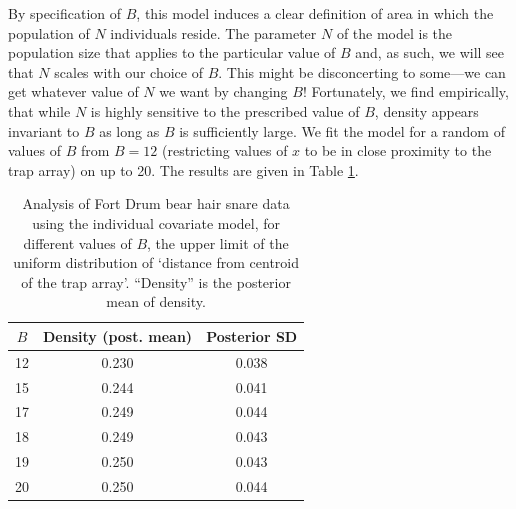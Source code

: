 By specification of $B$,
this model
induces a clear definition of area
in which the population of $N$ individuals reside.
The parameter $N$ of the model is the
population size that applies to the particular value of $B$ and,
as such, we will see that $N$ scales with our choice of $B$.
This might be disconcerting to some---we can get whatever value of
$N$ we want by changing $B$!
Fortunately, we find empirically, that while $N$ is
highly sensitive to the prescribed value of $B$, density appears
invariant to $B$ as long as $B$ is sufficiently
large. We fit the model for a random of values of $B$ from $B=12$ (restricting
values of $x$ to be in close proximity to
the trap array) on up to 20. The results are given in Table
\ref{closed.tab.Dmax}.

\begin{table}[ht]
\centering
\caption{Analysis of Fort Drum bear hair snare data using the
  individual covariate model, for different values of $B$, the upper
  limit of the uniform distribution of `distance from centroid of the
  trap array'. ``Density'' is the posterior mean of density.}
\begin{tabular}{ccc}
\hline \hline
 $B$ & Density (post. mean) & Posterior SD \\ \hline
  12& 0.230 & 0.038 \\
  15& 0.244 &0.041 \\
  17& 0.249 &0.044 \\
  18& 0.249 &0.043\\
  19& 0.250 &0.043\\
  20& 0.250 &0.044 \\
\hline
\end{tabular}
\label{closed.tab.Dmax}
\end{table}


